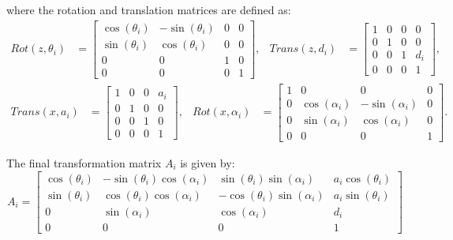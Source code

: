 where the rotation and translation matrices are defined as:
\noindent
\begin{align*}
  Rot(z, \theta_i) & = \begin{bmatrix}
                         \cos(\theta_i) & -\sin(\theta_i) & 0 & 0 \\
                         \sin(\theta_i) & \cos(\theta_i)  & 0 & 0 \\
                         0              & 0               & 1 & 0 \\
                         0              & 0               & 0 & 1
                       \end{bmatrix}, &
  Trans(z, d_i)    & = \begin{bmatrix}
                         1 & 0 & 0 & 0   \\
                         0 & 1 & 0 & 0   \\
                         0 & 0 & 1 & d_i \\
                         0 & 0 & 0 & 1
                       \end{bmatrix},                          
\end{align*}
\begin{align*}
  Trans(x, a_i)    & = \begin{bmatrix}
                         1 & 0 & 0 & a_i \\
                         0 & 1 & 0 & 0   \\
                         0 & 0 & 1 & 0   \\
                         0 & 0 & 0 & 1
                       \end{bmatrix},                          &
  Rot(x, \alpha_i) & = \begin{bmatrix}
                         1 & 0              & 0               & 0 \\
                         0 & \cos(\alpha_i) & -\sin(\alpha_i) & 0 \\
                         0 & \sin(\alpha_i) & \cos(\alpha_i)  & 0 \\
                         0 & 0              & 0               & 1
                       \end{bmatrix}.
\end{align*}

The final transformation matrix \( A_i \) is given by:
\[
  A_i = \begin{bmatrix}
    \cos(\theta_i) & -\sin(\theta_i)\cos(\alpha_i) & \sin(\theta_i)\sin(\alpha_i)  & a_i\cos(\theta_i) \\
    \sin(\theta_i) & \cos(\theta_i)\cos(\alpha_i)  & -\cos(\theta_i)\sin(\alpha_i) & a_i\sin(\theta_i) \\
    0              & \sin(\alpha_i)                & \cos(\alpha_i)                & d_i               \\
    0              & 0                             & 0                             & 1
  \end{bmatrix}
\]

